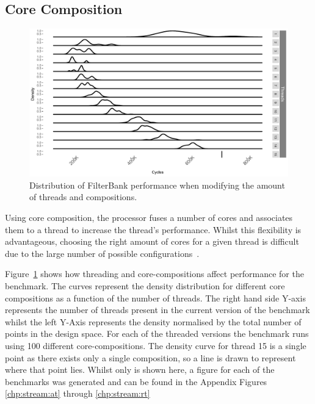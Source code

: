 \subsection{Core Composition}

\begin{figure}[t]
  \includegraphics[width=1\textwidth]{streamit-paper/graphics/filterbank_tot.pdf}
  \caption{Distribution of FilterBank performance when modifying the amount of threads and compositions.}\label{fig:fbtotal}
\end{figure}

Using core composition, the processor fuses a number of cores and associates them to a thread to increase the thread's performance.
Whilst this flexibility is advantageous, choosing the right amount of cores for a given thread is difficult due to the large number of possible configurations~\cite{gulati2008multitaskingdmc}.

Figure~\ref{fig:fbtotal} shows how threading and core-compositions affect performance for the  benchmark.
The curves represent the density distribution for different core compositions as a function of the number of threads.
The right hand side Y-axis represents the number of threads present in the current version of the benchmark whilst the left Y-Axis represents the density normalised by the total number of points in the design space.
For each of the threaded versions the benchmark runs using 100 different core-compositions.
The density curve for thread 15 is a single point as there exists only a single composition, so a line is drawn to represent where that point lies.
Whilst only  is shown here, a figure for each of the benchmarks was generated and can be found in the Appendix Figures \ref{chp:stream:at} through \ref{chp:stream:rt}

